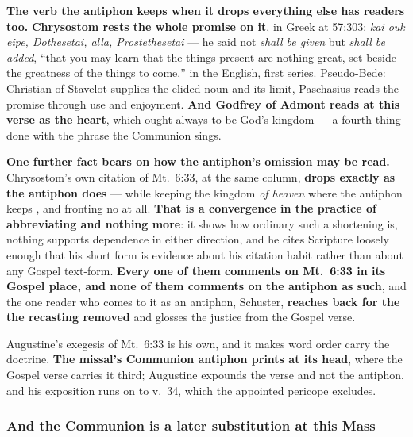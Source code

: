 \textbf{The verb the antiphon keeps when it drops everything else has readers
too.} \textbf{Chrysostom rests the whole promise on it}, in Greek at
 57:303: \emph{kai ouk eipe, Dothesetai, alla,
Prostethesetai} --- he said not \emph{shall be given} but \emph{shall be added},
``that you may learn that the things present are nothing great, set beside the
greatness of the things to come,'' in the 
English, first series. Pseudo-Bede:  Christian of
Stavelot supplies the elided noun and its limit,  Paschasius reads the promise
through use and enjoyment. \textbf{And Godfrey of Admont reads  at this verse as the heart}, which ought always to be God's kingdom
--- a fourth thing done with the phrase the Communion sings.

\textbf{One further fact bears on how the antiphon's omission may be read.}
Chrysostom's own citation of Mt.\ 6:33, at the same column, \textbf{drops
 exactly as the antiphon does} --- while keeping the
kingdom \emph{of heaven} where the antiphon keeps , and
fronting no  at all. \textbf{That is a convergence in the practice
of abbreviating and nothing more}: it shows how ordinary such a shortening is,
nothing supports dependence in either direction, and he cites Scripture loosely
enough that his short form is evidence about his citation habit rather than
about any Gospel text-form.
\textbf{Every one of them comments on Mt.\ 6:33 in its Gospel place, and none of
them comments on the antiphon as such}, and the one reader who
comes to it as an antiphon, Schuster, \textbf{reaches back for the
 the recasting removed} and glosses the justice from
the Gospel verse.

Augustine's exegesis of Mt.\ 6:33 is his own, and it makes word order carry the
doctrine. \textbf{The missal's Communion antiphon prints  at its
head}, where the Gospel verse carries it third; Augustine expounds the verse and
not the antiphon, and his exposition runs on to v.~34, which the appointed
pericope excludes.

\subsubsection*{And the Communion is a later substitution at this Mass}

